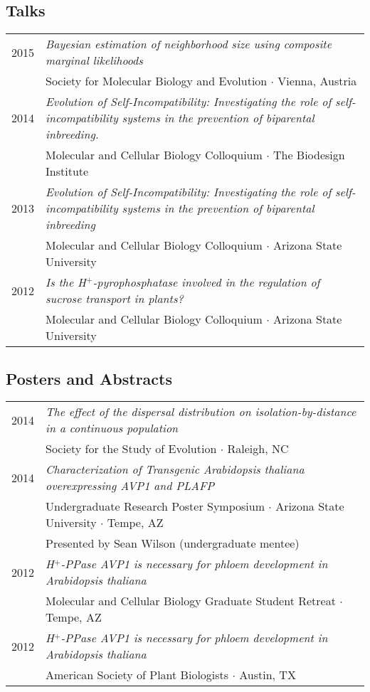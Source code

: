 \documentclass[11pt]{article}
\begin{document}
\subsection*{Talks}
\renewcommand{\arraystretch}{1}
\begin{tabularx}{\linewidth}{l X}
2015&\textit{Bayesian estimation of neighborhood size using composite marginal likelihoods}\\
&Society for Molecular Biology and Evolution $\cdotp$ Vienna, Austria\\
2014&\textit{Evolution of Self-Incompatibility: Investigating the role of self-incompatibility systems in the prevention of biparental inbreeding.}\\
&Molecular and Cellular Biology Colloquium $\cdotp$ The Biodesign Institute\\
2013&\textit{Evolution of Self-Incompatibility: Investigating the role of self-incompatibility systems in the prevention of biparental inbreeding}\\
&Molecular and Cellular Biology Colloquium $\cdotp$ Arizona State University\\
2012&\textit{Is the H$^+$-pyrophosphatase involved in the regulation of sucrose transport in plants?}\\
&Molecular and Cellular Biology Colloquium $\cdotp$ Arizona State University\\
\end{tabularx}
\subsection*{Posters and Abstracts}
\begin{tabularx}{\linewidth}{l X}
2014&\textit{The effect of the dispersal distribution on isolation-by-distance in a continuous population}\\
&Society for the Study of Evolution $\cdotp$ Raleigh, NC\\
2014&\textit{Characterization of Transgenic Arabidopsis thaliana overexpressing AVP1 and PLAFP}\\
&Undergraduate Research Poster Symposium $\cdotp$ Arizona State University $\cdotp$ Tempe, AZ\\
&Presented by Sean Wilson (undergraduate mentee)\\
2012&\textit{H$^+$-PPase AVP1 is necessary for phloem development in Arabidopsis thaliana}\\
&Molecular and Cellular Biology Graduate Student Retreat $\cdotp$ Tempe, AZ\\
2012&\textit{H$^+$-PPase AVP1 is necessary for phloem development in Arabidopsis thaliana}\\
&American Society of Plant Biologists $\cdotp$ Austin, TX\\
\end{tabularx}
\end{document}
